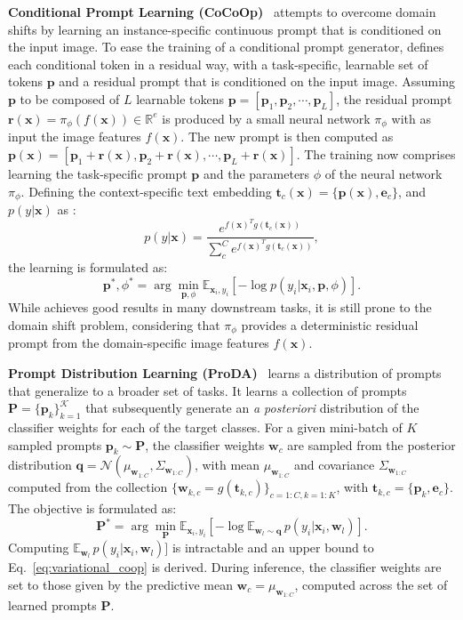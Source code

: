 \documentclass[10pt,twocolumn,letterpaper]{article}
\newcommand{\x}{\mathbf{x}}
\newcommand{\txt}{\mathbf{t}}
\newcommand{\w}{\mathbf{w}}
\newcommand{\e}{\mathbf{e}}
\newcommand{\p}{\mathbf{p}}
\def\rvr{{\mathbf{r}}}
\def\rvr{{\mathbf{r}}}
\begin{document}
\textbf{Conditional Prompt Learning (CoCoOp)}~\cite{zhou2022conditional} attempts to overcome domain shifts by learning an instance-specific continuous prompt that is conditioned on the input image. To ease the training of a conditional prompt generator, \cocoop defines each conditional token in a residual way, with a task-specific, learnable set of tokens $\p$ and a residual prompt that is conditioned on the input image. Assuming $\p$ to be composed of $L$ learnable tokens $\p {=} [\p_1, \p_2, \cdots , \p_L]$, the residual prompt $\rvr(\x) {=} \pi_\phi(f(\x)) \in \mathbb{R}^e$ is produced by a small neural network $\pi_\phi$ with as input the image features $f(\x)$. The new prompt is then computed as $\p(\x) {=} [\p_1 + \rvr(\x), \p_2 + \rvr(\x) , \cdots , \p_L + \rvr(\x)]$. The training now comprises learning the task-specific prompt $\p$ and the parameters $\phi$ of the neural network $\pi_\phi$. Defining the context-specific text embedding $\txt_c(\x) {=} \{\p(\x), \e_c \}$, and $p(y | \x)$ as :
\begin{equation}
\label{eq:prob_y}
    p(y | \x) = \frac{ e^{ f(\x)^T g( \txt_c(\x) )} }{ \sum_{c}^C e^{ f(\x)^T g( \txt_{c}(\x) ) } },
\end{equation}
the learning is formulated as:
\begin{equation}
    \label{eq:cocoop}
   \p^*, \phi^* = \arg \min_{\p, \phi} \mathbb{E}_{\x_i,y_i} [-\log p(y_i | \x_i, \p, \phi)].
\end{equation}
While \cocoop achieves good results in many downstream tasks, it is still prone to the domain shift problem, considering that $\pi_\phi$ provides a deterministic residual prompt from the domain-specific image features $f(\x)$.


\textbf{Prompt Distribution Learning (ProDA)}~\cite{lu2022prompt} learns a distribution of prompts that generalize to a broader set of tasks. It learns a collection of prompts $\mathbf{P}{=}\{\p_k\}_{k=1}^\mathcal{K}$ that subsequently generate an \textit{a posteriori} distribution of the classifier weights for each of the target classes. For a given mini-batch of $K$ sampled prompts $\p_k {\sim} \mathbf{P}$, the classifier weights $\w_c$ are sampled from the posterior distribution $\mathbf{q}{=}\mathcal{N}(\mu_{\w_{1:C}}, \Sigma_{\w_{1:C}})$, with mean $\mu_{\w_{1:C}}$ and covariance $\Sigma_{\w_{1:C}}$ computed from the collection $\{\w_{k,c} {=} g(\txt_{k,c})\}_{c=1:C, k=1:K}$, with $\txt_{k,c} = \{\p_k, \e_c\}$. The objective is formulated as: 
\begin{equation}
\label{eq:variational_coop}
   \mathbf{P}^* = \arg \min_{\mathbf{P}} \mathbb{E}_{\x_i,y_i} [-\log \mathbb{E}_{\w_l \sim \mathbf{q}}\, p(y_i | \x_i, \w_l)].
\end{equation}
Computing $\mathbb{E}_{\w_l} \, p(y_i | \x_i, \w_l)]$ is intractable and an upper bound to Eq.~\ref{eq:variational_coop} is derived. During inference, the classifier weights are set to those given by the predictive mean $\w_c {=} \mu_{\w_{1:C}}$, computed across the set of 
learned prompts $\mathbf{P}$. 
\end{document}
